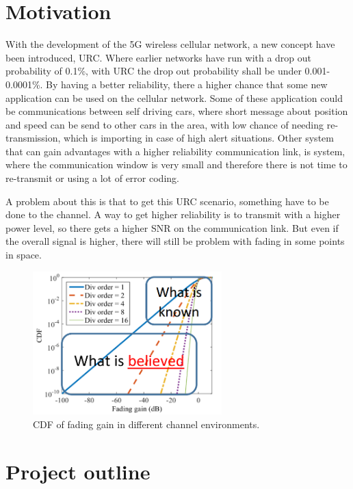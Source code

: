 \section{Motivation}
With the development of the 5G wireless cellular network, a new concept have been introduced, \gls{URC}. Where earlier networks have run with a drop out probability of 0.1\%, with URC the drop out probability shall be under 0.001-0.0001\%. By having a better reliability, there a higher chance that some new application can be used on the cellular network. 
Some of these application could be communications between self driving cars, where short message about position and speed can be send to other cars in the area, with low chance of needing re-transmission, which is importing in case of high alert situations. Other system that can gain advantages with a higher reliability communication link, is system, where the communication window is very small and therefore there is not time to re-transmit or using a lot of error coding.


A problem about this is that to get this URC scenario, something have to be done to the channel. A way to get higher reliability is to transmit with a higher power level, so there gets a higher \gls{SNR} on the communication link. But even if the overall signal is higher, there will still be problem with fading in some points in space. 


\begin{figure}[H]
\centering
\includegraphics[width=0.65\textwidth]{figures/fading_gain.png}
\caption{\gls{CDF} of fading gain in different channel environments.}
\label{fading_gain}
\end{figure}


\section{Project outline}





